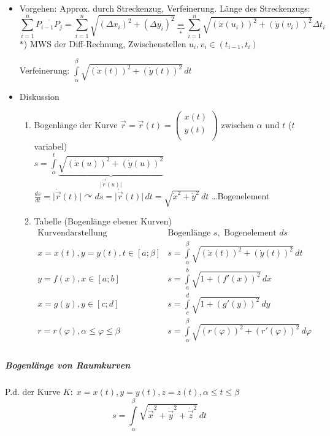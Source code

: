 \documentclass[a4paper]{scrartcl}
\begin{document}
\begin{itemize}
\item Vorgehen: Approx. durch Streckenzug, Verfeinerung. Länge des Streckenzugs:
\[\sum\limits_{i=1}^n \overline{P_{i-1}P_j} = \sum\limits_{i=1}^n \sqrt{(\Delta x_i)^2 + ( \Delta y_i)^2} \underbrace{=}_{*} \sum\limits_{i=1}^n \sqrt{(\dot{x} (u_i))^2 + (\dot{y} (v_i))^2} \Delta t_i\] 
$*$) MWS der Diff-Rechnung, Zwischenstellen $u_i,v_i \in (t_{i-1},t_i)$

Verfeinerung: $\int\limits_\alpha^\beta  \sqrt{(\dot{x} (t))^2 + (\dot{y} (t))^2 } \, dt$

\item Diskussion
\begin{enumerate}
\item Bogenlänge der Kurve $\vec{r} = \vec{r}(t) = \begin{pmatrix} x(t) \\ y(t) \\ \end{pmatrix}$ zwischen $\alpha$ und $t$ ($t$ variabel)\\
$s= \int\limits_\alpha^t \underbrace{\sqrt{(\dot{x} (u))^2 + ( \dot{y} (u))^2}}_{\lvert \vec{\dot{r}} (u) \rvert}$\\
$\frac{ds}{dt} = \lvert \dot{\vec{r}} (t) \rvert \curvearrowright ds = \lvert \dot{\vec{r}} (t) \rvert \, dt = \sqrt{\dot{x}^2 + \dot{y}^2} \, dt$ \dots Bogenelement
\item Tabelle (Bogenlänge ebener Kurven)\\
$\begin{array}{c|c}
\text{Kurvendarstellung} & \text{Bogenlänge } s, \text{ Bogenelement } ds \\ \hline
x=x(t), y=y(t) , t \in [a;\beta] & s = \int\limits_\alpha^\beta \sqrt{(\dot{x}(t))^2 + (\dot{y}(t))^2} \, dt \\
y=f(x), x \in [a;b] & s= \int\limits_a^b \sqrt{1+(f'(x))^2} \, dx \\
x=g(y), y \in [c;d] & s = \int\limits_c^d \sqrt{1+(g'(y))^2} \, dy\\
r=r(\varphi), \alpha \leq \varphi \leq \beta & s= \int\limits_\alpha^\beta \sqrt{(r(\varphi))^2  + (r' (\varphi))^2} \, d\varphi\\
\end{array}$
\end{enumerate}
\end{itemize}
\subparagraph{Bogenlänge von Raumkurven} P.d. der Kurve $K: \; x=x(t), y=y(t), z= z(t), \alpha \leq t \leq \beta$
\[ s= \int\limits_\alpha^\beta \sqrt{\dot{\vec{x}}^2 + \dot{\vec{y}}^2 + \dot{\vec{z}}^2 } \, dt\]
\end{document}
